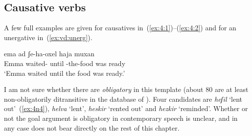 	\subsection{Causative verbs} \label{vd:thif:caus}
A few full examples are given for causatives in~(\ref{ex:4:1})--(\ref{ex:4:2}) and for an unergative in~(\ref{ex:vd:unerg}).
 \begin{exe}
 \ex  \label{ex:4:1}
 \begin{xlist} 
	
	
 \z
 \ex  \label{ex:4:2}
 \begin{xlist} 
	
	 
 \z
\ex  \label{ex:vd:unerg}  
 	{ \gll ema  ad ʃe-ha-oxel haja muxan\\
 	  Emma waited- until -the-food was ready\\
 	\glt `Emma waited until the food was ready.' } 
	
 \z 

I am not sure whether there are \emph{obligatory}  in this template (about 80 are at least non-obligatorily ditransitive in the database of \citealt{ahdout19phd}). Four candidates are \emph{heʃil} `lent out'~(\ref{ex:4n4}), \emph{helva} `lent',  \emph{heskir} `rented out' and \emph{hezkir} `reminded'. Whether or not the goal argument is obligatory in contemporary speech is unclear, and in any case does not bear directly on the rest of this chapter.
 \begin{exe}
 \label{ex:4n4}
		

\end{exe}
\end{xlist}
\end{xlist}
\end{exe}
